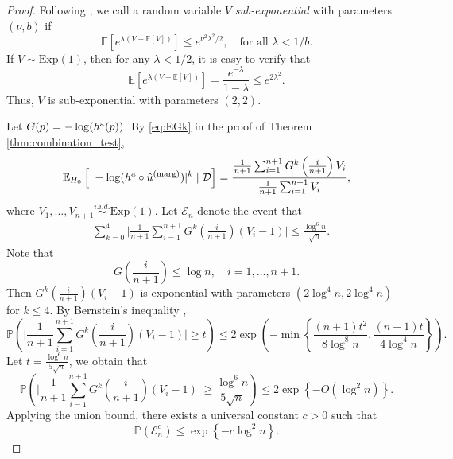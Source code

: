 \documentclass[11pt]{article}
\def\E{\mathbb{E}}
\def\marg{\textnormal{(marg)}}
\def\asym{\textnormal{a}}
\renewcommand{\P}{\mathbb{P}}
\newcommand{\D}{\mathcal{D}}
\newcommand{\event}{\mathcal{E}}
\newcommand{\lb}{\left(}
\newcommand{\rb}{\right)}
\begin{document}
\begin{proof}
  Following \cite{wainwright2019high}, we call a random variable $V$ \emph{sub-exponential} with parameters $(\nu, b)$ if
  \[\E[e^{\lambda(V - \E[V])}]\le e^{\nu^2\lambda^2 / 2}, \quad \text{for all }\lambda < 1 / b.\]
  If $V \sim \mathrm{Exp}(1)$, then for any $\lambda < 1/2$, it is easy to verify that
  \[\E[e^{\lambda(V - \E[V])}] = \frac{e^{-\lambda}}{1 - \lambda}\le e^{2\lambda^2}.\]
  Thus, $V$ is sub-exponential with parameters $(2, 2)$.

  Let $G(p) = -\log (h^\asym(p))$. By \eqref{eq:EGk} in the proof of Theorem \ref{thm:combination_test},
  \begin{equation}
    \label{eq:E_log_D}
    \E_{H_0}\left[|-\log (h^\asym \circ \hat{u}^\marg)|^k\mid \D\right] = \frac{\frac{1}{n+1}\sum_{i=1}^{n+1}G^k\left(\frac{i}{n+1}\right)V_{i}}{\frac{1}{n+1}\sum_{i=1}^{n+1}V_{i}},
  \end{equation}
  where $V_1, \ldots, V_{n+1}\stackrel{i.i.d.}{\sim} \mathrm{Exp}(1)$. Let $\event_n$ denote the event that
  \begin{align}
    &\sum_{k=0}^{4}\bigg|\frac{1}{n+1}\sum_{i=1}^{n+1}G^k\left(\frac{i}{n+1}\right)(V_{i} - 1)\bigg|\le \frac{\log^6 n}{\sqrt{n}}.    \label{eq:event_En}
  \end{align}
  Note that
  \[G\lb \frac{i}{n+1}\rb\le \log n, \quad i = 1, \ldots, n+1.\]
  Then $G^k\left(\frac{i}{n+1}\right)(V_{i} - 1)$ is exponential with parameters $(2\log^4 n, 2\log^4 n)$ for $k\le 4$. By Bernstein's inequality \citep[e.g.,][Proposition 2.9]{wainwright2019high},
  \[\P\lb\bigg|\frac{1}{n+1}\sum_{i=1}^{n+1}G^k\left(\frac{i}{n+1}\right)(V_{i} - 1)\bigg| \ge t\rb\le 2\exp\lb-\min\left\{\frac{(n+1)t^2}{8\log^8 n}, \frac{(n+1)t}{4\log^4 n}\right\}\rb.\]
  Let $t = \frac{\log^6 n}{5\sqrt{n}}$, we obtain that
  \[\P\lb\bigg|\frac{1}{n+1}\sum_{i=1}^{n+1}G^k\left(\frac{i}{n+1}\right)(V_{i} - 1)\bigg| \ge \frac{\log^6 n}{5\sqrt{n}}\rb\le 2\exp \left\{-O(\log^2 n)\right\}.\]
  Applying the union bound, there exists a universal constant $c > 0$ such that
  \begin{equation}
    \label{eq:prob_event_c}
    \P\lb \event_n^c\rb \le \exp \left\{-c\log^2 n\right\}.
  \end{equation}


\end{proof}
\end{document}
